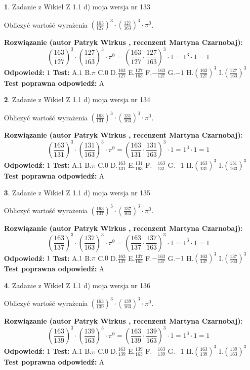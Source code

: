 \documentclass[12pt, a4paper]{article}
\theoremstyle{definition} %
\newtheorem{zad}{}
\newcommand{\zadStart}[1]{\begin{zad}#1\newline}
\newcommand{\zadStop}{\end{zad}}
\newcommand{\rozwStart}[2]{\noindent \textbf{Rozwiązanie (autor #1 , recenzent #2): }\newline}
\newcommand{\rozwStop}{\newline}
\newcommand{\odpStart}{\noindent \textbf{Odpowiedź:}\newline}
\newcommand{\odpStop}{\newline}
\newcommand{\testStart}{\noindent \textbf{Test:}\newline}
\newcommand{\testStop}{\newline}
\newcommand{\kluczStart}{\noindent \textbf{Test poprawna odpowiedź:}\newline}
\newcommand{\kluczStop}{\newline}
\begin{document}
\zadStart{Zadanie z Wikieł Z 1.1 d) moja wersja nr 133}

Obliczyć wartość wyrażenia $(\frac{163}{127})^{3} \cdot (\frac{127}{163})^{3} \cdot \pi^{0}$.
\zadStop
\rozwStart{Patryk Wirkus}{Martyna Czarnobaj}
$$(\frac{163}{127})^{3} \cdot (\frac{127}{163})^{3} \cdot \pi^{0} = (\frac{163}{127} \cdot \frac{127}{163})^{3} \cdot 1 = 1^{3} \cdot 1 = 1$$
\rozwStop
\odpStart
$1$
\odpStop
\testStart
A.$1$ B.$\pi$ C.$0$ D.$\frac{163}{127}$ E.$\frac{127}{163}$
F.$-\frac{163}{127}$ G.$-1$
H.$(\frac{163}{127})^{3}$
I.$(\frac{127}{163})^{3}$
\testStop
\kluczStart
A
\kluczStop



\zadStart{Zadanie z Wikieł Z 1.1 d) moja wersja nr 134}

Obliczyć wartość wyrażenia $(\frac{163}{131})^{3} \cdot (\frac{131}{163})^{3} \cdot \pi^{0}$.
\zadStop
\rozwStart{Patryk Wirkus}{Martyna Czarnobaj}
$$(\frac{163}{131})^{3} \cdot (\frac{131}{163})^{3} \cdot \pi^{0} = (\frac{163}{131} \cdot \frac{131}{163})^{3} \cdot 1 = 1^{3} \cdot 1 = 1$$
\rozwStop
\odpStart
$1$
\odpStop
\testStart
A.$1$ B.$\pi$ C.$0$ D.$\frac{163}{131}$ E.$\frac{131}{163}$
F.$-\frac{163}{131}$ G.$-1$
H.$(\frac{163}{131})^{3}$
I.$(\frac{131}{163})^{3}$
\testStop
\kluczStart
A
\kluczStop



\zadStart{Zadanie z Wikieł Z 1.1 d) moja wersja nr 135}

Obliczyć wartość wyrażenia $(\frac{163}{137})^{3} \cdot (\frac{137}{163})^{3} \cdot \pi^{0}$.
\zadStop
\rozwStart{Patryk Wirkus}{Martyna Czarnobaj}
$$(\frac{163}{137})^{3} \cdot (\frac{137}{163})^{3} \cdot \pi^{0} = (\frac{163}{137} \cdot \frac{137}{163})^{3} \cdot 1 = 1^{3} \cdot 1 = 1$$
\rozwStop
\odpStart
$1$
\odpStop
\testStart
A.$1$ B.$\pi$ C.$0$ D.$\frac{163}{137}$ E.$\frac{137}{163}$
F.$-\frac{163}{137}$ G.$-1$
H.$(\frac{163}{137})^{3}$
I.$(\frac{137}{163})^{3}$
\testStop
\kluczStart
A
\kluczStop



\zadStart{Zadanie z Wikieł Z 1.1 d) moja wersja nr 136}

Obliczyć wartość wyrażenia $(\frac{163}{139})^{3} \cdot (\frac{139}{163})^{3} \cdot \pi^{0}$.
\zadStop
\rozwStart{Patryk Wirkus}{Martyna Czarnobaj}
$$(\frac{163}{139})^{3} \cdot (\frac{139}{163})^{3} \cdot \pi^{0} = (\frac{163}{139} \cdot \frac{139}{163})^{3} \cdot 1 = 1^{3} \cdot 1 = 1$$
\rozwStop
\odpStart
$1$
\odpStop
\testStart
A.$1$ B.$\pi$ C.$0$ D.$\frac{163}{139}$ E.$\frac{139}{163}$
F.$-\frac{163}{139}$ G.$-1$
H.$(\frac{163}{139})^{3}$
I.$(\frac{139}{163})^{3}$
\testStop
\kluczStart
A
\kluczStop
\end{document}
